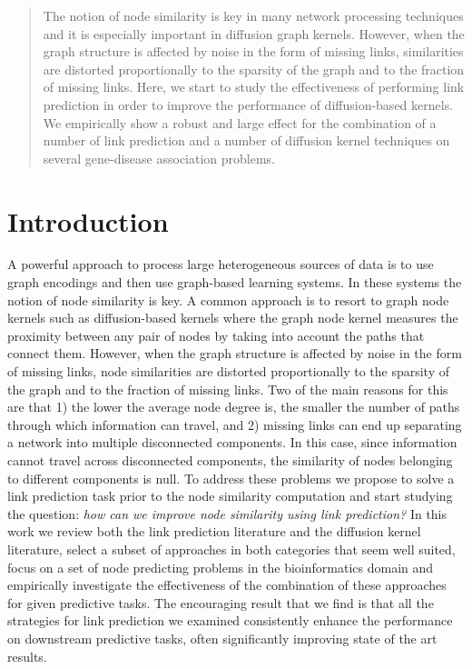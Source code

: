
\begin{abstract}

The notion of node similarity is key in many network processing techniques and
it is especially important in diffusion graph kernels. However, when the graph
structure is affected by noise in the form of missing links, similarities are
distorted  proportionally to the sparsity of the graph and to the fraction of
missing links. Here, we start to study the effectiveness of performing link
prediction  in order to improve the performance of diffusion-based kernels. We
empirically show a robust and large effect for the combination of a number of
link prediction and a number of diffusion kernel techniques on several
gene-disease association problems.

\end{abstract}


\section{Introduction}

A powerful approach to process large heterogeneous sources of data is to use
graph encodings \cite{proceeding1} \cite{jour1} and then use graph-based
learning systems. In these systems the notion of node similarity is key. A
common approach is to resort to graph node kernels such as diffusion-based
kernels \cite{proceeding2} where the graph node kernel measures the proximity
between any pair of nodes by taking into account the paths that connect them.
However, when the graph structure is affected by noise in the form of missing
links, node similarities are distorted  proportionally to the sparsity of the
graph and to the fraction of missing links. Two of the main reasons for this
are that 1) the lower the average node degree is, the smaller the number of
paths through which information can travel, and 2) missing links can end up
separating a network into multiple disconnected components. In this case,
since  information cannot travel across disconnected components, the
similarity of nodes belonging to different components is null. To address
these problems we propose to solve a link prediction task prior to the node
similarity computation and start studying the question: {\em how can we
improve node similarity using link prediction?} In this work we review both
the link prediction literature and the diffusion kernel literature, select a
subset of approaches in both categories that seem well suited, focus on a set
of node predicting problems in the bioinformatics domain and empirically
investigate the effectiveness of the combination of these approaches for given
predictive tasks. The encouraging result that we find is that all the
strategies for link prediction we examined consistently enhance the
performance on downstream predictive tasks, often significantly improving
state of the art results.
